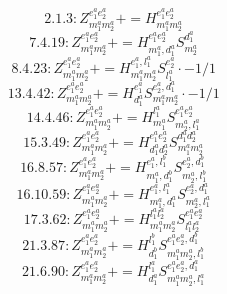 \documentclass[letterpaper,10pt,fleqn,leqno,onecolumn]{article}
\begin{document}
\begin{equation} \;\;\;\;\;\;  2.1.3: Z^{e_{1}^{a}e_{2}^{a}}_{m_{1}^{a}m_{2}^{a}}+=H^{e_{1}^{a}e_{2}^{a}}_{m_{1}^{a}m_{2}^{a}} \end{equation}
\begin{equation} \;\;\;\;\;\;  7.4.19: Z^{e_{1}^{a}e_{2}^{a}}_{m_{1}^{a}m_{2}^{a}}+=H^{e_{1}^{a}e_{2}^{a}}_{m_{1}^{a},d_{1}^{a}}S^{d_{1}^{a}}_{m_{2}^{a}} \end{equation}
\begin{equation} \;\;\;\;\;\;  8.4.23: Z^{e_{1}^{a}e_{2}^{a}}_{m_{1}^{a}m_{2}^{a}}+=H^{e_{1}^{a},l_{1}^{a}}_{m_{1}^{a}m_{2}^{a}}S^{e_{2}^{a}}_{l_{1}^{a}}\cdot -1/1 \end{equation}
\begin{equation} \;\;\;\;\;\;  13.4.42: Z^{e_{1}^{a}e_{2}^{a}}_{m_{1}^{a}m_{2}^{a}}+=H^{e_{1}^{a}}_{d_{1}^{a}}S^{e_{2}^{a},d_{1}^{a}}_{m_{1}^{a}m_{2}^{a}}\cdot -1/1 \end{equation}
\begin{equation} \;\;\;\;\;\;  14.4.46: Z^{e_{1}^{a}e_{2}^{a}}_{m_{1}^{a}m_{2}^{a}}+=H^{l_{1}^{a}}_{m_{1}^{a}}S^{e_{1}^{a}e_{2}^{a}}_{m_{2}^{a},l_{1}^{a}} \end{equation}
\begin{equation} \;\;\;\;\;\;  15.3.49: Z^{e_{1}^{a}e_{2}^{a}}_{m_{1}^{a}m_{2}^{a}}+=H^{e_{1}^{a}e_{2}^{a}}_{d_{1}^{a}d_{2}^{a}}S^{d_{1}^{a}d_{2}^{a}}_{m_{1}^{a}m_{2}^{a}} \end{equation}
\begin{equation} \;\;\;\;\;\;  16.8.57: Z^{e_{1}^{a}e_{2}^{a}}_{m_{1}^{a}m_{2}^{a}}+=H^{e_{1}^{a},l_{1}^{b}}_{m_{1}^{a},d_{1}^{b}}S^{e_{2}^{a},d_{1}^{b}}_{m_{2}^{a},l_{1}^{b}} \end{equation}
\begin{equation} \;\;\;\;\;\;  16.10.59: Z^{e_{1}^{a}e_{2}^{a}}_{m_{1}^{a}m_{2}^{a}}+=H^{e_{1}^{a},l_{1}^{a}}_{m_{1}^{a},d_{1}^{a}}S^{e_{2}^{a},d_{1}^{a}}_{m_{2}^{a},l_{1}^{a}} \end{equation}
\begin{equation} \;\;\;\;\;\;  17.3.62: Z^{e_{1}^{a}e_{2}^{a}}_{m_{1}^{a}m_{2}^{a}}+=H^{l_{1}^{a}l_{2}^{a}}_{m_{1}^{a}m_{2}^{a}}S^{e_{1}^{a}e_{2}^{a}}_{l_{1}^{a}l_{2}^{a}} \end{equation}
\begin{equation} \;\;\;\;\;\;  21.3.87: Z^{e_{1}^{a}e_{2}^{a}}_{m_{1}^{a}m_{2}^{a}}+=H^{l_{1}^{b}}_{d_{1}^{b}}S^{e_{1}^{a}e_{2}^{a},d_{1}^{b}}_{m_{1}^{a}m_{2}^{a},l_{1}^{b}} \end{equation}
\begin{equation} \;\;\;\;\;\;  21.6.90: Z^{e_{1}^{a}e_{2}^{a}}_{m_{1}^{a}m_{2}^{a}}+=H^{l_{1}^{a}}_{d_{1}^{a}}S^{e_{1}^{a}e_{2}^{a},d_{1}^{a}}_{m_{1}^{a}m_{2}^{a},l_{1}^{a}} \end{equation}
\end{document}
